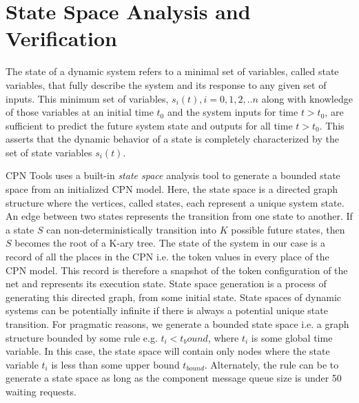 \chapter{State Space Analysis and Verification}
\label{chapter:analysis}

The state of a dynamic system refers to a minimal set of variables, called state variables, that fully describe the system and its response to any given set of inputs. This minimum set of variables, $s_i(t), i=0,1,2,..n$ along with knowledge of those variables at an initial time $t_0$ and the system inputs for time $t > t_0$, are sufficient to predict the future system state and outputs for all time $t > t_0$. This asserts that the dynamic behavior of a state is completely characterized by the set of state variables $s_i(t)$. 

CPN Tools uses a built-in \emph{state space} analysis tool to generate a bounded state space from an initialized CPN model. Here, the state space is a directed graph structure where the vertices, called states, each represent a unique system state. An edge between two states represents the transition from one state to another. If a state $S$ can non-deterministically transition into $K$ possible future states, then $S$ becomes the root of a K-ary tree. The state of the system in our case is a record of all the places in the CPN i.e. the token values in every place of the CPN model. This record is therefore a snapshot of the token configuration of the net and represents its execution state. State space generation is a process of generating this directed graph, from some initial state. State spaces of dynamic systems can be potentially infinite if there is always a potential unique state transition. For pragmatic reasons, we generate a bounded state space i.e. a graph structure bounded by some rule e.g. $t_i < t_bound$, where $t_i$ is some global time variable. In this case, the state space will contain only nodes where the state variable $t_i$ is less than some upper bound $t_{bound}$. Alternately, the rule can be to generate a state space as long as the component message queue size is under 50 waiting requests. 

